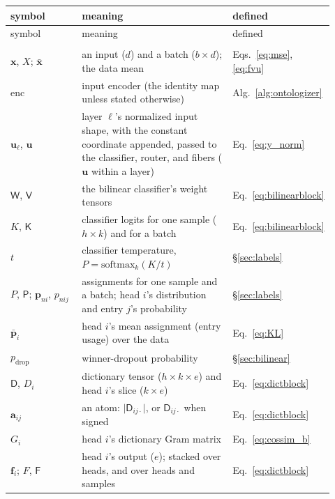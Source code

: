 \begingroup\small
\begin{longtable}{@{}>{\raggedright\arraybackslash}p{0.25\linewidth}%
>{\raggedright\arraybackslash}p{0.52\linewidth}%
>{\raggedright\arraybackslash}p{0.15\linewidth}@{}}
\toprule
symbol & meaning & defined \\
\midrule
\endfirsthead
\toprule
symbol & meaning & defined \\
\midrule
\endhead
\bottomrule
\endfoot
\bottomrule
\endlastfoot
\multicolumn{3}{@{}l}{\emph{The model}} \\[2pt]
$\mathbf{x}$, $X$; $\bar{\mathbf{x}}$ & an input ($d$) and a batch ($b\times d$); the data mean & Eqs.~\eqref{eq:mse}, \eqref{eq:fvu} \\
$\mathrm{enc}$ & input encoder (the identity map unless stated otherwise) & Alg.~\ref{alg:ontologizer} \\
$\mathbf{u}_\ell$, $\mathbf{u}$ & layer $\ell$'s normalized input shape, with the constant coordinate appended, passed to the classifier, router, and fibers ($\mathbf{u}$ within a layer) & Eq.~\eqref{eq:y_norm} \\
$\mathsf{W}$, $\mathsf{V}$ & the bilinear classifier's weight tensors & Eq.~\eqref{eq:bilinearblock} \\
$K$, $\mathsf{K}$ & classifier logits for one sample ($h\times k$) and for a batch & Eq.~\eqref{eq:bilinearblock} \\
$t$ & classifier temperature, $P = \mathrm{softmax}_k(K/t)$ & §\ref{sec:labels} \\
$P$, $\mathsf{P}$; $\mathbf{p}_{ni}$, $p_{nij}$ & assignments for one sample and a batch; head $i$'s distribution and entry $j$'s probability & §\ref{sec:labels} \\
$\bar{\mathbf{p}}_i$ & head $i$'s mean assignment (entry usage) over the data & Eq.~\eqref{eq:KL} \\
$p_{\mathrm{drop}}$ & winner-dropout probability & §\ref{sec:bilinear} \\
$\mathsf{D}$, $D_i$ & dictionary tensor ($h\times k\times e$) and head $i$'s slice ($k\times e$) & Eq.~\eqref{eq:dictblock} \\
$\mathbf{a}_{ij}$ & an atom: $\lvert\mathsf{D}_{ij\cdot}\rvert$, or $\mathsf{D}_{ij\cdot}$ when signed & Eq.~\eqref{eq:dictblock} \\
$G_i$ & head $i$'s dictionary Gram matrix & Eq.~\eqref{eq:cossim_b} \\
$\mathbf{f}_i$; $F$, $\mathsf{F}$ & head $i$'s output ($e$); stacked over heads, and over heads and samples & Eq.~\eqref{eq:dictblock} \\

\end{longtable}
